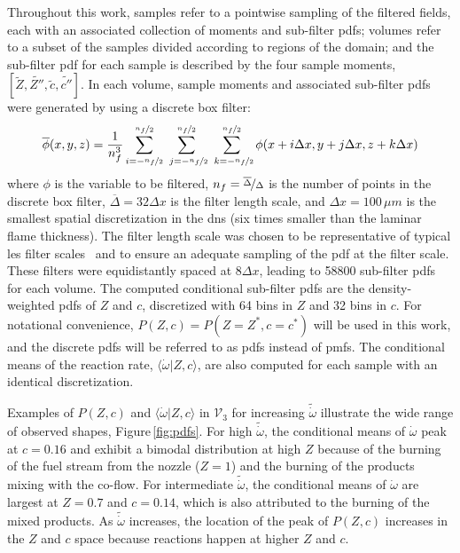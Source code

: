 \documentclass[review]{elsarticle}
\newcommand{\wt}[1]{\widetilde{#1}}
\newcommand{\ol}[1]{\overline{#1}}
\begin{document}
Throughout this work, samples refer to a pointwise sampling of the
filtered fields, each with an associated collection of moments and
sub-filter \glspl{pdf}; volumes refer to a subset of the samples
divided according to regions of the domain; and the sub-filter
\gls{pdf} for each sample is described by the four sample moments,
$\left[\wt{Z}, \wt{Z''}, \wt{c}, \wt{c''}\right]$. In each volume,
sample moments and associated sub-filter \glspl{pdf} were generated by
using a discrete box filter:
\begin{align}
  \label{eq:box}
  \ol{\phi} (x, y, z) = \frac{1}{n_f^3}\sum_{i=-\nicefrac{n_f}{2}}^{\nicefrac{n_f}{2}} \sum_{~j=-\nicefrac{n_f}{2}}^{\nicefrac{n_f}{2}} \sum_{~k=-\nicefrac{n_f}{2}}^{\nicefrac{n_f}{2}} \phi(x + i \Delta x, y + j \Delta x, z + k \Delta x) 
\end{align}
where $\phi$ is the variable to be filtered,
$n_f = \nicefrac{\ol{\Delta}}{\Delta}$ is the number of points in the
discrete box filter, $\ol{\Delta} = 32 \Delta x$ is the filter length
scale, and $\Delta x = 100 \,\unit{\mu m}$ is the smallest spatial
discretization in the \gls{dns} (six times smaller than the laminar
flame thickness). The filter length scale was chosen to be
representative of typical \gls{les} filter scales~\cite{Pitsch2006a}
and to ensure an adequate sampling of the \gls{pdf} at the filter
scale. These filters were equidistantly spaced at $8\Delta x$, leading
to 58800 sub-filter \glspl{pdf} for each volume. The computed
conditional sub-filter \glspl{pdf} are the density-weighted
\glspl{pdf} of $Z$ and $c$, discretized with 64 bins in $Z$ and 32 bins
in $c$. For notational convenience, $P(Z,c) = P(Z = Z^*, c=c^*)$ will
be used in this work, and the discrete \glspl{pdf} will be referred to
as \glspl{pdf} instead of \acrlong{pmf}s. The conditional means of the
reaction rate, $\langle \dot{\omega} | Z, c \rangle$, are also
computed for each sample with an identical discretization.

Examples of $P(Z,c)$ and $\langle \dot{\omega} | Z, c \rangle$ in
$\mathcal{V}_3$ for increasing $\wt{\dot{\omega}}$ illustrate the wide
range of observed shapes, Figure\,\ref{fig:pdfs}. For high
$\wt{\dot{\omega}}$, the conditional means of $\dot{\omega}$ peak at
$c=0.16$ and exhibit a bimodal distribution at high $Z$ because of the
burning of the fuel stream from the nozzle ($Z=1$) and the burning of
the products mixing with the co-flow. For intermediate
$\wt{\dot{\omega}}$, the conditional means of $\dot{\omega}$ are
largest at $Z=0.7$ and $c=0.14$, which is also attributed to the
burning of the mixed products. As $\wt{\dot{\omega}}$ increases, the
location of the peak of $P(Z, c)$ increases in the $Z$ and $c$ space
because reactions happen at higher $Z$ and $c$.
\end{document}

